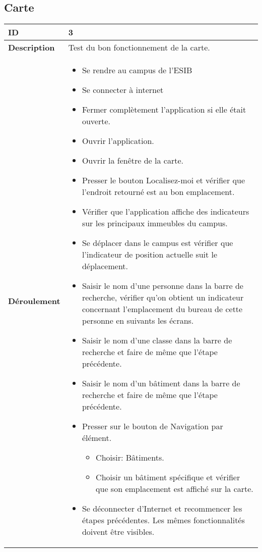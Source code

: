 		\subsection{Carte}
					 \begin{longtable}{m{4cm}|p{10cm}|}
					 \textbf{ ID} & 3 \\
					 \hline \textbf{Description} & Test du bon fonctionnement de la carte.\\
					 \hline \textbf{Déroulement} &
						 \begin{itemize}
						  	\item Se rendre au campus de l'ESIB
						  	\item Se connecter à internet
							 \item Fermer complètement l'application si elle était ouverte.
							 \item Ouvrir l'application.
							 \item Ouvrir la fenêtre de la carte.
							 \item Presser le bouton Localisez-moi et vérifier que l'endroit retourné est au bon emplacement.
							 \item Vérifier que l'application affiche des indicateurs sur les principaux immeubles du campus.
							 \item Se déplacer dans  le campus est vérifier que l'indicateur de position actuelle suit le déplacement.
							\item Saisir le nom d'une personne dans la barre de recherche, vérifier qu'on obtient un indicateur concernant l'emplacement du bureau de cette personne en suivants les écrans.
							\item Saisir le nom d'une classe dans la barre de recherche et faire de même que l'étape précédente.
							\item Saisir le nom d'un bâtiment dans la barre de recherche et faire de même que l'étape précédente.
							\item Presser sur le bouton de Navigation par élément.
							\begin{itemize}
								\item Choisir: Bâtiments. 
								\item Choisir un bâtiment  spécifique et vérifier que son emplacement est affiché sur la carte. 
							\end{itemize}
							\item Se déconnecter d'Internet et recommencer les étapes précédentes. Les mêmes fonctionnalités doivent être visibles.
						 \end{itemize}
					 \\
				 \end{longtable} 
				 

